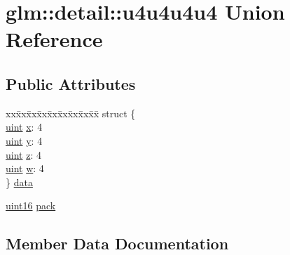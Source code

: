 \hypertarget{unionglm_1_1detail_1_1u4u4u4u4}{}\section{glm\+:\+:detail\+:\+:u4u4u4u4 Union Reference}
\label{unionglm_1_1detail_1_1u4u4u4u4}
\subsection*{Public Attributes}
\begin{DoxyCompactItemize}
\item 
\begin{tabbing}
xx\=xx\=xx\=xx\=xx\=xx\=xx\=xx\=xx\=\kill
struct \{\\
\>\mbox{\hyperlink{group__core__precision_ga4fd29415871152bfb5abd588334147c8}{uint}} \mbox{\hyperlink{unionglm_1_1detail_1_1u4u4u4u4_a41dd5af8fc599a451d74967a2c97e750}{x}}: 4\\
\>\mbox{\hyperlink{group__core__precision_ga4fd29415871152bfb5abd588334147c8}{uint}} \mbox{\hyperlink{unionglm_1_1detail_1_1u4u4u4u4_a1c5a971d31d261db43863e8e95d81ecb}{y}}: 4\\
\>\mbox{\hyperlink{group__core__precision_ga4fd29415871152bfb5abd588334147c8}{uint}} \mbox{\hyperlink{unionglm_1_1detail_1_1u4u4u4u4_a1635b8d41a367114239565da102ad6b9}{z}}: 4\\
\>\mbox{\hyperlink{group__core__precision_ga4fd29415871152bfb5abd588334147c8}{uint}} \mbox{\hyperlink{unionglm_1_1detail_1_1u4u4u4u4_a7a6644d1d5c02008e670d714d26124af}{w}}: 4\\
\} \mbox{\hyperlink{unionglm_1_1detail_1_1u4u4u4u4_ae3d2d4b0c6a49c3c92981bbb5e658418}{data}}\\

\end{tabbing}\item 
\mbox{\hyperlink{namespaceglm_1_1detail_a47b2a7d006d187338e8031a352d1ce56}{uint16}} \mbox{\hyperlink{unionglm_1_1detail_1_1u4u4u4u4_aa989a8fab51b41be68d0d07147fba3b8}{pack}}
\end{DoxyCompactItemize}


\subsection{Member Data Documentation}
\mbox{\label{unionglm_1_1detail_1_1u4u4u4u4_ae3d2d4b0c6a49c3c92981bbb5e658418}} 
